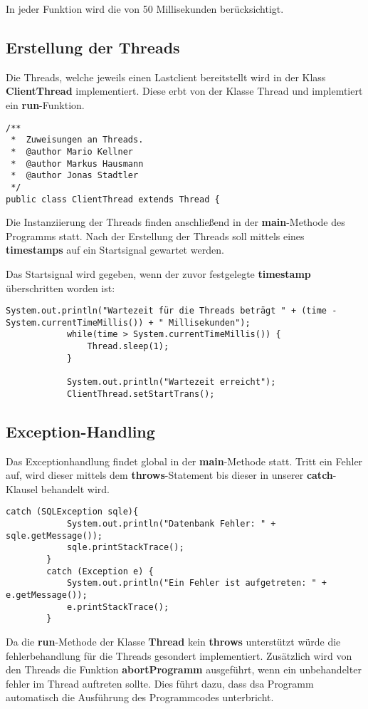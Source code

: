 In jeder Funktion wird die  von 50 Millisekunden berücksichtigt.

\subsection{Erstellung der Threads}

Die Threads, welche jeweils einen Lastclient bereitstellt wird in der Klass
\textbf{ClientThread} implementiert. Diese erbt von der Klasse Thread und
implemtiert ein \textbf{run}-Funktion.

\begin{lstlisting}[caption={Ausschnitt aus ClientThread}]
/**
 *  Zuweisungen an Threads.
 *  @author Mario Kellner
 *	@author Markus Hausmann
 *  @author Jonas Stadtler
 */
public class ClientThread extends Thread {
\end{lstlisting}

Die Instanziierung der Threads finden anschließend in der
\textbf{main}-Methode des Programms statt. Nach der Erstellung der Threads
soll mittels eines \textbf{timestamps} auf ein Startsignal gewartet werden.


Das Startsignal wird gegeben, wenn der zuvor festgelegte \textbf{timestamp}
überschritten worden ist:

\begin{lstlisting}[caption={Wartezeit}]
		    System.out.println("Wartezeit für die Threads beträgt " + (time - System.currentTimeMillis()) + " Millisekunden");
		    while(time > System.currentTimeMillis()) {
		    	Thread.sleep(1);
		    }
		    
		    System.out.println("Wartezeit erreicht");
		    ClientThread.setStartTrans();
\end{lstlisting}


\subsection{Exception-Handling}

Das Exceptionhandlung findet global in der \textbf{main}-Methode statt. Tritt
ein Fehler auf, wird dieser mittels dem \textbf{throws}-Statement
 bis dieser in unserer \textbf{catch}-Klausel behandelt wird.

\begin{lstlisting}[caption={Catch-Block}]
		catch (SQLException sqle){
			System.out.println("Datenbank Fehler: " + sqle.getMessage());
			sqle.printStackTrace();
		}
 		catch (Exception e) {
			System.out.println("Ein Fehler ist aufgetreten: " + e.getMessage());
			e.printStackTrace();
		}
\end{lstlisting}

Da die \textbf{run}-Methode der Klasse \textbf{Thread} kein \textbf{throws}
unterstützt würde die fehlerbehandlung für die Threads gesondert implementiert.
Zusätzlich wird von den Threads die Funktion \textbf{abortProgramm}
ausgeführt, wenn ein unbehandelter fehler im Thread auftreten sollte. Dies führt
dazu, dass dsa Programm automatisch die Ausführung des Programmcodes
unterbricht.

\clearpage